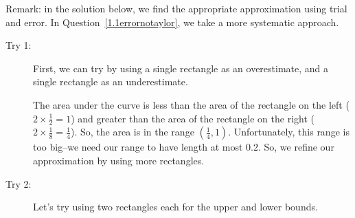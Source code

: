 \begin{solution}
Remark: in the solution below, we find the appropriate approximation using trial and error. In Question~\ref{1.1errornotaylor}, we take a more systematic approach.
\begin{description}
\item[Try 1:] First, we can try by using a single rectangle as an overestimate, and a single rectangle as an underestimate.

\begin{center}
\qquad
{}
\end{center}

The area under the curve is less than the area of the rectangle on the left ($2 \times \frac{1}{2}=1$) and greater than the area of the rectangle on the right ($2 \times \frac{1}{8}=\frac{1}{4}$). So, the area is in the range $\left(\frac{1}{4},1\right)$. Unfortunately, this range is too big--we need our range to have length at most 0.2. So, we refine our approximation by using more rectangles.

\item[Try 2:] Let's try using two rectangles each for the upper and lower bounds.


\end{description}
\end{solution}
